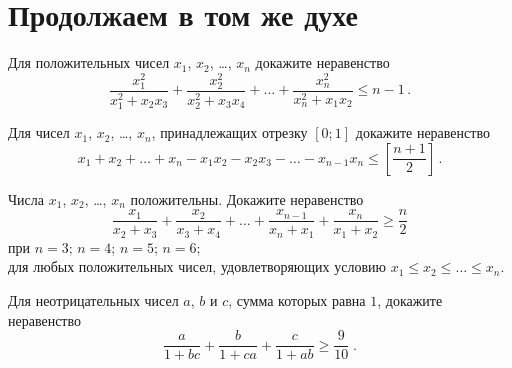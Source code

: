 
\section*{Продолжаем в том же духе}


\begin{problems}

\item
Для положительных чисел $x_{1}$, $x_{2}$, \ldots, $x_{n}$ докажите неравенство
\[
    \frac{x_{1}^2}{x_{1}^2 + x_{2} x_{3}} +
    \frac{x_{2}^2}{x_{2}^2 + x_{3} x_{4}} +
    \ldots +
    \frac{x_{n}^2}{x_{n}^2 + x_{1} x_{2}}
\leq
    n - 1
\, . \]

\item
Для чисел $x_{1}$, $x_{2}$, \ldots, $x_{n}$, принадлежащих отрезку $[0; 1]$
докажите неравенство
\[
    x_{1} + x_{2} + \ldots + x_{n}
    - x_{1} x_{2} - x_{2} x_{3} - \ldots - x_{n-1} x_{n}
\leq
    \left[ \frac{n + 1}{2} \right]
\, . \]

\item
Числа $x_{1}$, $x_{2}$, \ldots, $x_{n}$ положительны.
Докажите неравенство
\[
    \frac{x_{1}}{x_{2} + x_{3}} +
    \frac{x_{2}}{x_{3} + x_{4}} +
    \ldots +
    \frac{x_{n-1}}{x_{n} + x_{1}} +
    \frac{x_{n}}{x_{1} + x_{2}}
\geq
    \frac{n}{2}
\]
при
\quad
\subproblem $n = 3$;
\quad
\subproblem $n = 4$;
\quad
\subproblem $n = 5$;
\quad
\subproblem $n = 6$;
\\
\subproblem
для любых положительных чисел, удовлетворяющих условию
$x_{1} \leq x_{2} \leq \ldots \leq x_{n}$.

\item
Для неотрицательных чисел $a$, $b$ и $c$, сумма которых равна $1$, докажите
неравенство
\[
    \frac{a}{1 + b c} + \frac{b}{1 + c a} + \frac{c}{1 + a b}
\geq
    \frac{9}{10}
\; . \]

\end{problems}

